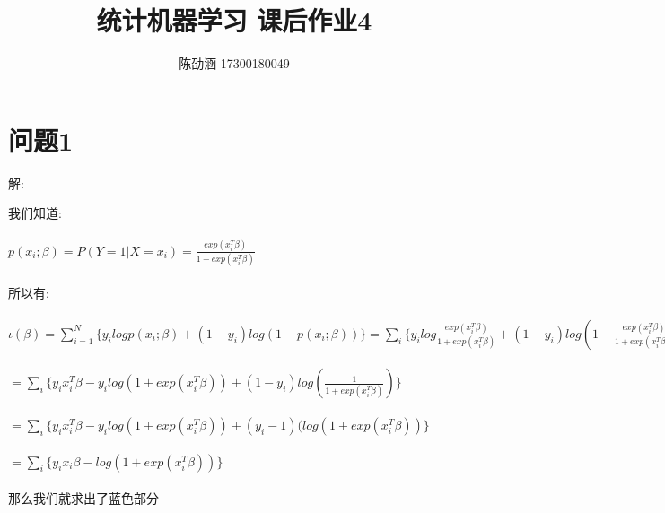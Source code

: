 \documentclass[]{article}
\title{统计机器学习 课后作业4}
\author{陈劭涵 17300180049}
\begin{document}
	
\maketitle


\section{问题1}
\begin{flushleft}
解:
\end{flushleft}
我们知道:\\\\
$p(x_i;\beta)=P(Y=1|X=x_i)=\frac{exp(x_i^T\beta)}{1+exp(x_i^T\beta)}$\\\\
所以有:\\\\
$\iota(\beta)=\sum_{i=1}^{N}\{y_ilogp(x_i;\beta)+(1-y_i)log(1-p(x_i;\beta))\}=\sum_{i}\{y_ilog\frac{exp(x_i^T\beta)}{1+exp(x_i^T\beta)}+(1-y_i)log(1-\frac{exp(x_i^T\beta)}{1+exp(x_i^T\beta)})\}$\\\\
$=\sum_{i}\{y_ix_i^T\beta-y_ilog(1+exp(x_i^T\beta))+(1-y_i)log(\frac{1}{1+exp(x_i^T\beta)})\}$\\\\
$=\sum_{i}\{y_ix_i^T\beta-y_ilog(1+exp(x_i^T\beta))+(y_i-1)(log(1+exp(x_i^T\beta))\}$\\\\
$=\sum_{i}\{y_ix_i\beta-log(1+exp(x_i^T\beta))\}$\\\\
那么我们就求出了蓝色部分
\end{document}
